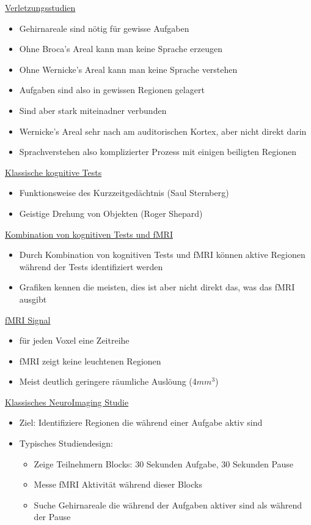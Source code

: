 \documentclass[a4paper,10pt,oneside]{article}
\begin{document}
\underline{Verletzungsstudien} \\
	\begin{itemize}
		\item Gehirnareale sind nötig für gewisse Aufgaben
		\item Ohne Broca's Areal kann man keine Sprache erzeugen
		\item Ohne Wernicke's Areal kann man keine Sprache verstehen
		\item Aufgaben sind also in gewissen Regionen gelagert
		\item Sind aber stark miteinadner verbunden
		\item Wernicke's Areal sehr nach am auditorischen Kortex, aber nicht direkt darin
		\item Sprachverstehen also komplizierter Prozess mit einigen beiligten Regionen 
	\end{itemize}
	
\underline{Klassische kognitive Tests} \\
	\begin{itemize}
		\item  Funktionsweise des Kurzzeitgedächtnis (Saul Sternberg)
		\item Geistige Drehung von Objekten (Roger Shepard)
	\end{itemize}
	
\underline{Kombination von kognitiven Tests und fMRI} \\
	\begin{itemize}
		\item Durch Kombination von kognitiven Tests und fMRI können aktive Regionen während der Tests identifiziert werden
		\item Grafiken kennen die meisten, dies ist aber nicht direkt das, was das fMRI ausgibt
	\end{itemize}

\underline{fMRI Signal} \\
	\begin{itemize}
		\item für jeden Voxel eine Zeitreihe
		\item fMRI zeigt keine leuchtenen Regionen
		\item Meist deutlich geringere räumliche Auslöung (4$mm^3$)
	\end{itemize}

\underline{Klassisches NeuroImaging Studie} \\
	\begin{itemize}
		\item Ziel: Identifiziere Regionen die während einer Aufgabe aktiv sind
		\item Typisches Studiendesign:
			\begin{itemize}
				\item Zeige Teilnehmern Blocks: 30 Sekunden Aufgabe, 30 Sekunden Pause
				\item Messe fMRI Aktivität während dieser Blocks
				\item Suche Gehirnareale die während der Aufgaben aktiver sind als während der Pause
			\end{itemize}
	\end{itemize}
\end{document}
